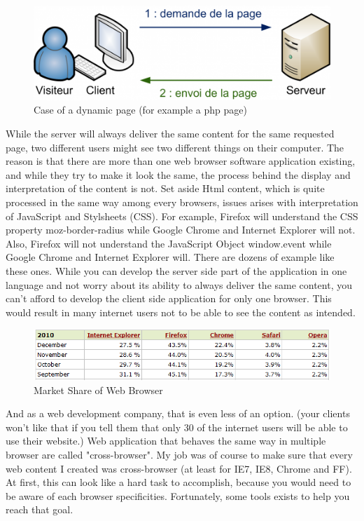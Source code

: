 \begin{figure}[!ht]
\centering
\includegraphics[width=.55\textwidth]{img/static.png}
\caption{Case of a dynamic page (for example a php page)}
\label{figure:dynamic-page}
\end{figure}

While the server will always deliver the same content for the same requested page, two different users might see two different things on their computer. 
The reason is that there are more than one web browser software application existing, and while they try to make it look the same, the process behind the display and interpretation of the content is not. Set aside Html content, which is quite processed in the same way among every browsers, issues arises with interpretation of
JavaScript and Stylsheets (CSS). For example, Firefox will understand the CSS property moz-border-radius while Google Chrome and Internet Explorer will not. Also, Firefox will not understand the JavaScript Object window.event while Google Chrome and Internet Explorer will. There are dozens of example like these ones.
While you can develop the server side part of the application in one language and not worry about its ability to always deliver the same content, you can't afford to develop the client side application for only one browser. This would result in many internet users not to be able to see the content as intended.
\begin{figure}[!ht]
\centering
\includegraphics[width=.55\textwidth]{img/browser_statistics.png}
\caption{Market Share of Web Browser}
\label{figure:market-brosers}
\end{figure}
And as a web development company, that is even less of an option. (your clients won't like that if you tell them that only 30 of the internet users will be able to use their website.)
Web application that behaves the same way in multiple browser are called "cross-browser". 
My job was of course to make sure that every web content I created was cross-browser (at least for IE7, IE8, Chrome and FF).
At first, this can look like a hard task to accomplish, because you would need to be aware of each browser specificities. Fortunately, some tools exists to help you reach that goal.

